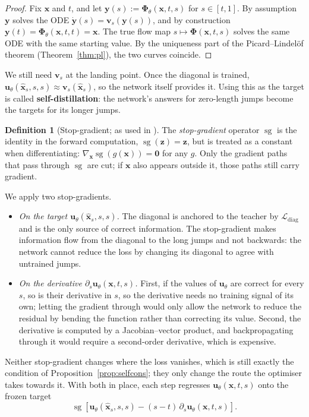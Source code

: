 \documentclass[11pt,a4paper]{article}
\numberwithin{equation}{section}     %
\theoremstyle{plain}        %
\theoremstyle{definition}   %
\newtheorem{definition}[theorem]{Definition}
\theoremstyle{remark}       %
\begin{document}
\begin{proof}
Fix $\mathbf{x}$ and $t$, and let $\mathbf{y}(s):=\boldsymbol{\Phi}_\theta(\mathbf{x},t,s)$ for $s\in[t,1]$. By assumption $\mathbf{y}$ solves the ODE $\dot{\mathbf{y}}(s)=\mathbf{v}_s(\mathbf{y}(s))$, and by construction $\mathbf{y}(t)=\boldsymbol{\Phi}_\theta(\mathbf{x},t,t)=\mathbf{x}$. The true flow map $s\mapsto\boldsymbol{\Phi}(\mathbf{x},t,s)$ solves the same ODE with the same starting value. By the uniqueness part of the Picard--Lindel\"of theorem (Theorem~\ref{thm:pl}), the two curves coincide.
\end{proof}

We still need $\mathbf{v}_s$ at the landing point. Once the diagonal is trained, $\mathbf{u}_\theta(\hat{\mathbf{x}}_s,s,s)\approx\mathbf{v}_s(\hat{\mathbf{x}}_s)$, so the network itself provides it. Using this as the target is called \textbf{self-distillation}: the network's answers for zero-length jumps become the targets for its longer jumps.

\begin{definition}[Stop-gradient; as used in \citealp{boffi2025build,ouyang2026}]\label{def:sg}
The \emph{stop-gradient} operator $\operatorname{sg}$ is the identity in the forward computation, $\operatorname{sg}(\mathbf{z})=\mathbf{z}$, but is treated as a constant when differentiating: $\nabla_{\mathbf{x}}\operatorname{sg}\left(g(\mathbf{x})\right)=\mathbf{0}$ for any $g$. Only the gradient paths that pass through $\operatorname{sg}$ are cut; if $\mathbf{x}$ also appears outside it, those paths still carry gradient.
\end{definition}

We apply two stop-gradients.
\begin{itemize}
\item \emph{On the target $\mathbf{u}_\theta(\hat{\mathbf{x}}_s,s,s)$.} The diagonal is anchored to the teacher by $\mathcal{L}_{\mathrm{diag}}$ and is the only source of correct information. The stop-gradient makes information flow from the diagonal to the long jumps and not backwards: the network cannot reduce the loss by changing its diagonal to agree with untrained jumps.
\item \emph{On the derivative $\partial_s\mathbf{u}_\theta(\mathbf{x},t,s)$.} First, if the values of $\mathbf{u}_\theta$ are correct for every $s$, so is their derivative in $s$, so the derivative needs no training signal of its own; letting the gradient through would only allow the network to reduce the residual by bending the function rather than correcting its value. Second, the derivative is computed by a Jacobian--vector product, and backpropagating through it would require a second-order derivative, which is expensive.
\end{itemize}
Neither stop-gradient changes where the loss vanishes, which is still exactly the condition of Proposition~\ref{prop:selfcons}; they only change the route the optimiser takes towards it. With both in place, each step regresses $\mathbf{u}_\theta(\mathbf{x},t,s)$ onto the frozen target
\[
\operatorname{sg}\left[\mathbf{u}_\theta(\hat{\mathbf{x}}_s,s,s)-(s-t)\,\partial_s\mathbf{u}_\theta(\mathbf{x},t,s)\right].
\]
\end{document}
